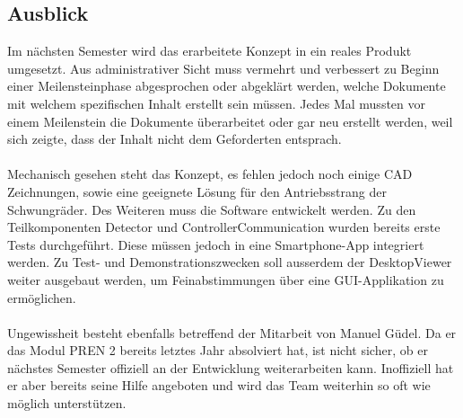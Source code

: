 ﻿\subsection{Ausblick}
Im nächsten Semester wird das erarbeitete Konzept in ein reales Produkt umgesetzt. Aus administrativer Sicht muss vermehrt und verbessert zu Beginn einer Meilensteinphase abgesprochen oder abgeklärt werden, welche Dokumente mit welchem spezifischen Inhalt erstellt sein müssen. Jedes Mal mussten vor einem Meilenstein die Dokumente überarbeitet oder gar neu erstellt werden, weil sich zeigte, dass der Inhalt nicht dem Geforderten entsprach.\\
\\
Mechanisch gesehen steht das Konzept, es fehlen jedoch noch einige CAD Zeichnungen, sowie eine geeignete Lösung für den Antriebsstrang der Schwungräder. Des Weiteren muss die Software entwickelt werden. Zu den Teilkomponenten Detector und ControllerCommunication wurden bereits erste Tests durchgeführt. Diese müssen jedoch in eine Smartphone-App integriert werden. Zu Test- und Demonstrationszwecken soll ausserdem der DesktopViewer weiter ausgebaut werden, um Feinabstimmungen über eine GUI-Applikation zu ermöglichen.\\
\\
Ungewissheit besteht ebenfalls betreffend der Mitarbeit von Manuel Güdel. Da er das Modul PREN 2 bereits letztes Jahr absolviert hat, ist nicht sicher, ob er nächstes Semester offiziell an der Entwicklung weiterarbeiten kann. Inoffiziell hat er aber bereits seine Hilfe angeboten und wird das Team weiterhin so oft wie möglich unterstützen.
